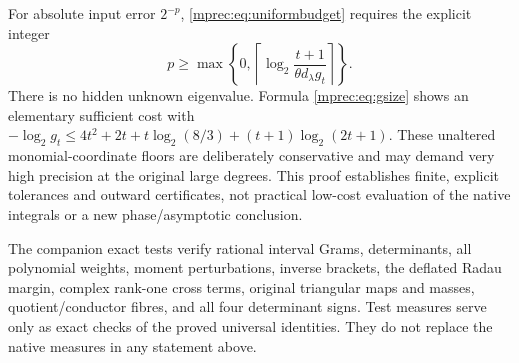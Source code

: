 For absolute input error $2^{-p}$, \eqref{mprec:eq:uniformbudget}
requires the explicit integer
\[
 p\ge\max\left\{0,
 \left\lceil\log_2\frac{t+1}{\theta d_\lambda g_t}\right\rceil
 \right\}.
\]
There is no hidden unknown eigenvalue. Formula \eqref{mprec:eq:gsize}
shows an elementary sufficient cost with
$-\log_2g_t\le4t^2+2t+t\log_2(8/3)
 +(t+1)\log_2(2t+1)$.
These unaltered monomial-coordinate floors are deliberately
conservative and may demand very high precision at the original
large degrees. This proof establishes finite, explicit tolerances
and outward certificates, not practical low-cost evaluation of
the native integrals or a new phase/asymptotic conclusion.

The companion exact tests verify rational interval Grams,
determinants, all polynomial weights, moment perturbations, inverse
brackets, the deflated Radau margin, complex rank-one cross terms,
original triangular maps and masses, quotient/conductor fibres,
and all four determinant signs. Test measures serve only as exact
checks of the proved universal identities. They do not replace the
native measures in any statement above.

